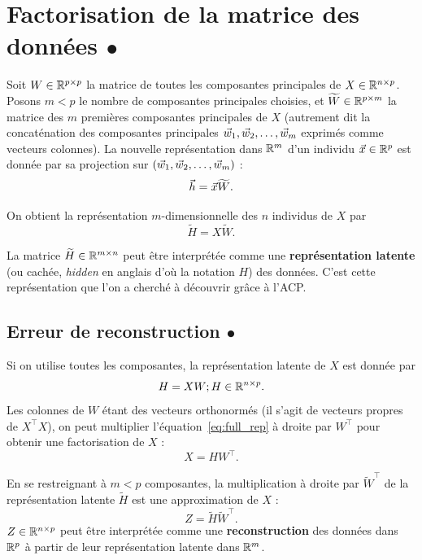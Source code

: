 \section{Factorisation de la matrice des données $\bullet$}
Soit $W \in \mathbb{R}^{p \times p}$ la matrice de toutes les composantes principales de
$X \in \mathbb{R}^{n \times p}$. Posons $m< p$ le nombre de composantes principales choisies, et
$\widetilde{W} \in \mathbb{R}^{p \times m}$ la matrice des $m$ premières composantes
principales de $X$ (autrement dit la concaténation des composantes principales
$\ww_1, \ww_2, \dots, \ww_m$ exprimés comme vecteurs colonnes). La nouvelle
représentation dans $\mathbb{R}^m$ d'un individu $\xx \in \RR^p$ est donnée par sa
projection sur $(\ww_1, \ww_2, \dots, \ww_m)$ :
\begin{equation}
  \label{eq:reduced_rep_vector}
  \hh = \xx \widetilde{W}.
\end{equation}

On obtient la représentation $m$-dimensionnelle des $n$ individus de $X$ par
\begin{equation}
  \label{eq:reduced_rep}
  \widetilde{H} = X \widetilde{W}.
\end{equation}

La matrice $\widetilde{H} \in \mathbb{R}^{m \times n}$ peut être interprétée comme une
\textbf{représentation latente} (ou cachée, {\it hidden} en anglais d'où la
notation $H$) des données. C'est cette représentation que l'on a cherché à
découvrir grâce à l'ACP.


\subsection{Erreur de reconstruction $\bullet$}
Si on utilise toutes les composantes, la représentation latente de $X$ est donnée par 
\begin{equation}
  \label{eq:full_rep}
  H = X W; H \in \mathbb{R}^{n \times p}.
\end{equation}
Les colonnes de $W$ étant des vecteurs orthonormés (il s'agit de vecteurs
propres de $X^\top X$), on peut multiplier l'équation~\eqref{eq:full_rep} à
droite par $W^\top$ pour obtenir une factorisation de $X$ :
\begin{equation}
  \label{eq:pca_factor}
  X = H W^\top.
\end{equation}

En se restreignant à $m < p$ composantes, la multiplication à droite par
$\widetilde{W}^\top$ de la représentation latente $\widetilde{H}$ est une approximation de
$X$ :
\begin{equation}
  \label{eq:pca_factor_approx}
  Z = \widetilde{H} \widetilde{W}^\top.
\end{equation}
$Z \in \mathbb{R}^{n \times p}$ peut être interprétée comme une
\textbf{reconstruction} des données dans $\mathbb{R}^p$ à partir de leur
représentation latente dans $\mathbb{R}^m$.

